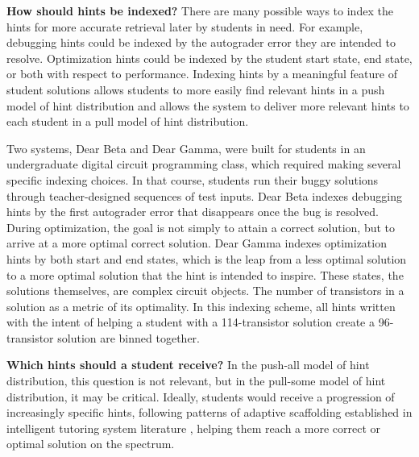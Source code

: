 {\bf How should hints be indexed?} There are many possible ways to index the hints for more accurate retrieval later by students in need. For example, debugging hints could be indexed by the autograder error they are intended to resolve. Optimization hints could be indexed by the student start state, end state, or both with respect to performance. Indexing hints by a meaningful feature of student solutions allows students to more easily find relevant hints in a push model of hint distribution and allows the system to deliver more relevant hints to each student in a pull model of hint distribution. 


Two systems, Dear Beta and Dear Gamma, were built for students in an undergraduate digital circuit programming class, which required making several specific indexing choices. In that course, students run their buggy solutions through teacher-designed sequences of test inputs. Dear Beta indexes debugging hints by the first autograder error that disappears once the bug is resolved. During optimization, the goal is not simply to attain a correct solution, but to arrive at a more optimal correct solution. Dear Gamma indexes optimization hints by both start and end states, which is the leap from a less optimal solution to a more optimal solution that the hint is intended to inspire. These states, the solutions themselves, are complex circuit objects. The number of transistors in a solution as a metric of its optimality. In this indexing scheme, all hints written with the intent of helping a student with a 114-transistor solution create a 96-transistor solution are binned together.

{\bf Which hints should a student receive?} In the push-all model of hint distribution, this question is not relevant, but in the pull-some model of hint distribution, it may be critical. Ideally, students would receive a progression of increasingly specific hints, following patterns of adaptive scaffolding established in intelligent tutoring system literature \cite{andes}, helping them reach a more correct or optimal solution on the spectrum. 

